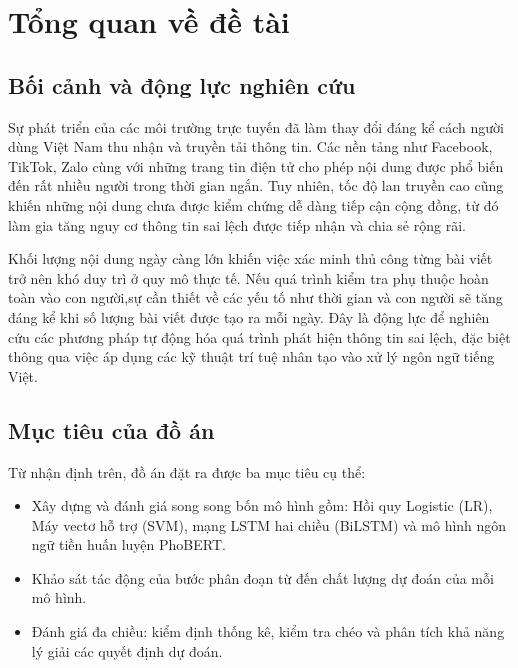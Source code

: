 %

\chapter{Tổng quan về đề tài}
\label{introduction}

\section{Bối cảnh và động lực nghiên cứu}

Sự phát triển của các môi trường trực tuyến đã làm thay đổi đáng kể cách người dùng Việt Nam thu nhận và truyền tải thông tin. Các nền tảng như Facebook, TikTok, Zalo cùng với những trang tin điện tử cho phép nội dung được phổ biến đến rất nhiều người trong thời gian ngắn. Tuy nhiên, tốc độ lan truyền cao cũng khiến những nội dung chưa được kiểm chứng dễ dàng tiếp cận cộng đồng, từ đó làm gia tăng nguy cơ thông tin sai lệch được tiếp nhận và chia sẻ rộng rãi.

Khối lượng nội dung ngày càng lớn khiến việc xác minh thủ công từng bài viết trở nên khó duy trì ở quy mô thực tế. Nếu quá trình kiểm tra phụ thuộc hoàn toàn vào con người,sự cần thiết về các yếu tố như thời gian và con người sẽ tăng đáng kể khi số lượng bài viết được tạo ra mỗi ngày. Đây là động lực để nghiên cứu các phương pháp tự động hóa quá trình phát hiện thông tin sai lệch, đặc biệt thông qua việc áp dụng các kỹ thuật trí tuệ nhân tạo vào xử lý ngôn ngữ tiếng Việt.

\section{Mục tiêu của đồ án}

Từ nhận định trên, đồ án đặt ra được ba mục tiêu cụ thể:

\begin{itemize}[leftmargin=2em]
  \item Xây dựng và đánh giá song song bốn mô hình gồm: Hồi quy Logistic (LR), Máy vectơ hỗ trợ (SVM), mạng LSTM hai chiều (BiLSTM) và mô hình ngôn ngữ tiền huấn luyện PhoBERT.
  \item Khảo sát tác động của bước phân đoạn từ đến chất lượng dự đoán của mỗi mô hình.
  \item Đánh giá đa chiều: kiểm định thống kê, kiểm tra chéo và phân tích khả năng lý giải các quyết định dự đoán.
\end{itemize}
